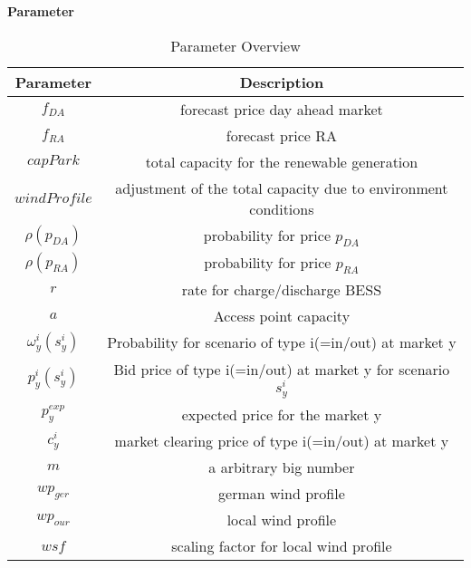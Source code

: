 \textbf{Parameter}
\begin{table}[H]
	\centering
	\begin{tabular}{c|c}
		\textbf{Parameter}      & \textbf{Description}                                           \\
		\hline
		$f_{DA}$                & forecast price day ahead market                                \\
		$f_{RA}$                & forecast price RA                                              \\
		$capPark$               & total capacity for the renewable generation                    \\
		$windProfile$           & adjustment of the total capacity due to environment conditions \\
		$\rho(p_{DA})$          & probability for price $p_{DA}$                                 \\
		$\rho(p_{RA})$          & probability for price $p_{RA}$                                 \\
		$r$                     & rate for charge/discharge BESS                                 \\
		$a$                     & Access point capacity                                          \\
		$\omega^i_{y}(s^i_{y})$ & Probability for scenario of type i(=in/out) at market y        \\
		$p^i_{y}(s^i_y)$        & Bid price of type i(=in/out) at market y for scenario $s^i_y$  \\
		$p^{exp}_{y}$           & expected price for the market y                                \\
		$c^i_y$                 & market clearing price of type i(=in/out) at market y           \\
		$m$                     & a arbitrary big number                                         \\
		$wp_{ger}$              & german wind profile                                            \\
		$wp_{our}$              & local wind profile                                             \\
		$wsf$                   & scaling factor for local wind profile
	\end{tabular}
	\caption{Parameter Overview}
	\label{tab:Parameter_Overview}
\end{table}





